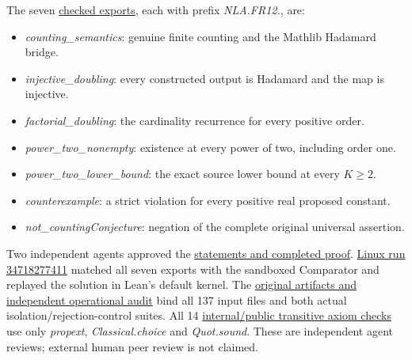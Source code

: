 \documentclass[11pt,a4paper]{article}
\providecommand{\tightlist}{\setlength{\itemsep}{0pt}\setlength{\parskip}{0pt}}
\begin{document}
The seven
\href{https://github.com/sgstepaniants/OpenProblemsInNLA/blob/3e20bae9a07b1a33db8fdfb18bdebb9e590071a9/frames-and-matrix-designs/FR-12/lean/Solution.lean}{checked
exports}, each with prefix \textit{NLA.FR12.}, are:

\begin{itemize}
\tightlist
\item
  \textit{counting\_semantics}: genuine finite counting and the Mathlib
  Hadamard bridge.
\item
  \textit{injective\_doubling}: every constructed output is Hadamard and
  the map is injective.
\item
  \textit{factorial\_doubling}: the cardinality recurrence for every
  positive order.
\item
  \textit{power\_two\_nonempty}: existence at every power of two,
  including order one.
\item
  \textit{power\_two\_lower\_bound}: the exact source lower bound at
  every \(K\ge2\).
\item
  \textit{counterexample}: a strict violation for every positive real
  proposed constant.
\item
  \textit{not\_countingConjecture}: negation of the complete original
  universal assertion.
\end{itemize}

Two independent agents approved the
\href{https://github.com/ajt60gaibb/OpenProblemsInNLA/blob/main/frames-and-matrix-designs/FR-12/lean/reviews}{statements
and completed proof}.
\href{https://github.com/sgstepaniants/OpenProblemsInNLA/actions/runs/34718277411}{Linux
run 34718277411} matched all seven exports with the sandboxed Comparator
and replayed the solution in Lean's default kernel. The
\href{https://github.com/ajt60gaibb/OpenProblemsInNLA/blob/main/frames-and-matrix-designs/FR-12/lean/verification/linux-2026-09-12}{original
artifacts and independent operational audit} bind all 137 input files
and both actual isolation/rejection-control suites. All 14
\href{https://github.com/ajt60gaibb/OpenProblemsInNLA/blob/main/frames-and-matrix-designs/FR-12/lean/verification/linux-2026-09-12/axiom-verification.json}{internal/public
transitive axiom checks} use only \textit{propext},
\textit{Classical.choice} and \textit{Quot.sound}. These are independent
agent reviews; external human peer review is not claimed.
\end{document}
